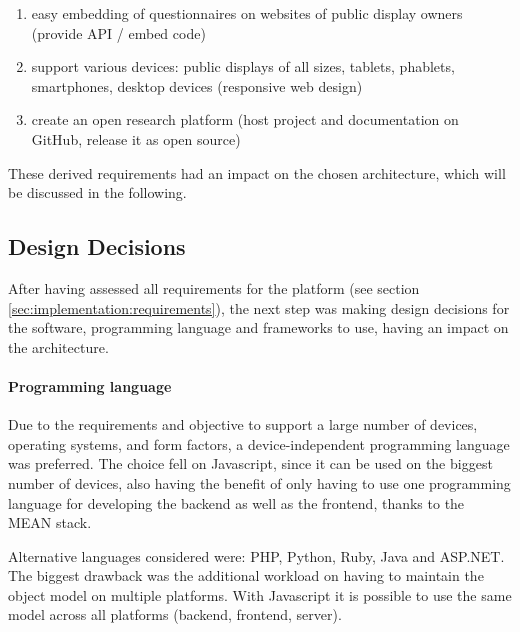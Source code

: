 
	\begin{enumerate}[itemsep=0pt] 
	\item easy embedding of questionnaires on websites of public display owners (provide API / embed code)
	\item support various devices: public displays of all sizes, tablets, phablets, smartphones, desktop devices (responsive web design)
	\item create an open research platform (host project and documentation on GitHub, release it as open source)
	\end{enumerate}


	These derived requirements had an impact on the chosen architecture, which will be discussed in the following.





\subsection{Design Decisions}
\label{sec:implementation:design-decisions}

	After having assessed all requirements for the platform (see section \ref{sec:implementation:requirements}), the next step was making design decisions for the software, programming language and frameworks to use, having an impact on the architecture.


	\paragraph{Programming language}

		Due to the requirements and objective to support a large number of devices, operating systems, and form factors, a device-independent programming language was preferred. 
		The choice fell on Javascript, since it can be used on the biggest number of devices, also having the benefit of only having to use one programming language for developing the backend as well as the frontend, thanks to the MEAN stack.

		Alternative languages considered were: PHP, Python, Ruby, Java and ASP.NET. The biggest drawback was the additional workload on having to maintain the object model on multiple platforms. With Javascript it is possible to use the same model across all platforms (backend, frontend, server).



